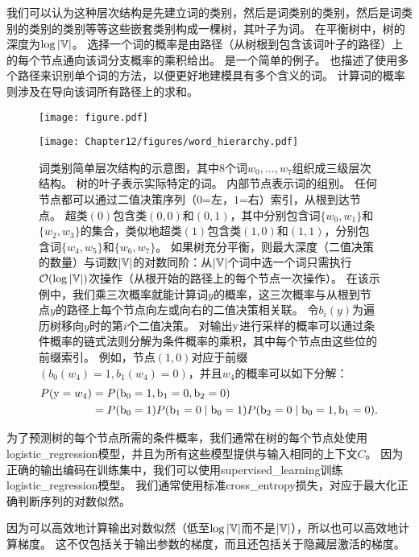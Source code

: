 我们可以认为这种层次结构是先建立词的类别，然后是词类别的类别，然后是词类别的类别的类别等等这些嵌套类别构成一棵树，其叶子为词。
在平衡树中，树的深度为$\log |\mathbb{V}|$。
选择一个词的概率是由路径（从树根到包含该词叶子的路径）上的每个节点通向该词分支概率的乘积给出。
是一个简单的例子。
\citet{Mnih+Hinton-2009}也描述了使用多个路径来识别单个词的方法，以便更好地建模具有多个含义的词。
计算词的概率则涉及在导向该词所有路径上的求和。
\begin{figure}[htp]
\centering
\ifOpenSource
\centerline{\texttt{[image: figure.pdf]}}
\else
\texttt{[image: Chapter12/figures/word\_hierarchy.pdf]}
\fi
\captionsetup{singlelinecheck=off}
\caption[.]{词类别简单层次结构的示意图，其中8个词$w_0,\dots,w_7$组织成三级层次结构。
树的叶子表示实际特定的词。
内部节点表示词的组别。
任何节点都可以通过二值决策序列（$0$=左，$1$=右）索引，从根到达节点。
超类$(0)$包含类$(0,0)$和$(0,1)$，其中分别包含词$\{w_0,w_1\}$和$\{w_2,w_3\}$的集合，类似地超类$(1)$包含类$(1,0)$和$(1,1)$，分别包含词$\{w_4,w_5\}$和$\{w_6,w_7\}$。
如果树充分平衡，则最大深度（二值决策的数量）与词数$| \mathbb{V} |$的对数同阶：从$| \mathbb{V} |$个词中选一个词只需执行$\mathcal{O}(\log |\mathbb{V}|)$次操作（从根开始的路径上的每个节点一次操作）。
在该示例中，我们乘三次概率就能计算词$y$的概率，这三次概率与从根到节点$y$的路径上每个节点向左或向右的二值决策相关联。
令$b_i(y)$为遍历树移向$y$时的第$i$个二值决策。
对输出$\mathrm{y}$进行采样的概率可以通过条件概率的链式法则分解为条件概率的乘积，其中每个节点由这些位的前缀索引。
例如，节点$(1,0)$对应于前缀$(b_0(w_4)=1, b_1(w_4)=0)$，并且$w_4$的概率可以如下分解：
\begin{align}
  P(\mathrm{y} = w_4) &= P(\mathrm{b}_0 = 1, \mathrm{b}_1 = 0, \mathrm{b}_2 = 0) \\
    &= P(\mathrm{b}_0 = 1) P(\mathrm{b}_1 = 0 \mid \mathrm{b}_0 = 1) P(\mathrm{b}_2 = 0 \mid \mathrm{b}_0 = 1, \mathrm{b}_1 = 0). 
\end{align}
}
\label{fig:chap12_word_hierarchy}
\end{figure}

为了预测树的每个节点所需的条件概率，我们通常在树的每个节点处使用\gls{logistic_regression}模型，并且为所有这些模型提供与输入相同的上下文$C$。
因为正确的输出编码在训练集中，我们可以使用\gls{supervised_learning}训练\gls{logistic_regression}模型。
我们通常使用标准\gls{cross_entropy}损失，对应于最大化正确判断序列的对数似然。

因为可以高效地计算输出对数似然（低至$\log |\mathbb{V}|$而不是$ |\mathbb{V}|$），所以也可以高效地计算梯度。
这不仅包括关于输出参数的梯度，而且还包括关于隐藏层激活的梯度。

